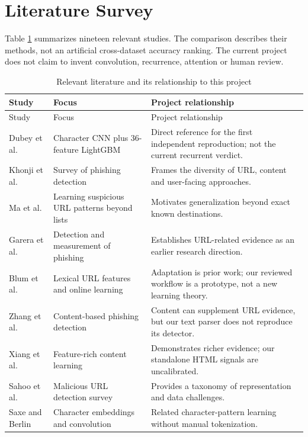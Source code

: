 \section{Literature Survey}
Table \ref{tab:lit} summarizes nineteen relevant studies. The comparison describes their methods, not an artificial cross-dataset accuracy ranking. The current project does not claim to invent convolution, recurrence, attention or human review.
\begin{singlespace}\small
\begin{longtable}{p{}p{}p{}}
\caption{Relevant literature and its relationship to this project}\label{tab:lit}\\
\toprule Study & Focus & Project relationship\\\midrule\endfirsthead
\toprule Study & Focus & Project relationship\\\midrule\endhead
Dubey et al. \cite{dubey2025phishx} & Character CNN plus 36-feature LightGBM & Direct reference for the first independent reproduction; not the current recurrent verdict.\\
Khonji et al. \cite{khonji2013survey} & Survey of phishing detection & Frames the diversity of URL, content and user-facing approaches.\\
Ma et al. \cite{ma2009blacklists} & Learning suspicious URL patterns beyond lists & Motivates generalization beyond exact known destinations.\\
Garera et al. \cite{garera2007framework} & Detection and measurement of phishing & Establishes URL-related evidence as an earlier research direction.\\
Blum et al. \cite{blum2010lexical} & Lexical URL features and online learning & Adaptation is prior work; our reviewed workflow is a prototype, not a new learning theory.\\
Zhang et al. \cite{zhang2007cantina} & Content-based phishing detection & Content can supplement URL evidence, but our text parser does not reproduce its detector.\\
Xiang et al. \cite{xiang2011cantina} & Feature-rich content learning & Demonstrates richer evidence; our standalone HTML signals are uncalibrated.\\
Sahoo et al. \cite{sahoo2017survey} & Malicious URL detection survey & Provides a taxonomy of representation and data challenges.\\
Saxe and Berlin \cite{saxe2017expose} & Character embeddings and convolution & Related character-pattern learning without manual tokenization.\\

\end{longtable}
\end{singlespace}
